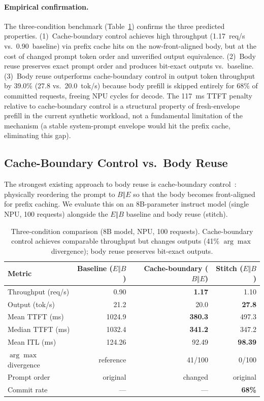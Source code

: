 \documentclass[conference]{IEEEtran}
\begin{document}
\paragraph{Empirical confirmation.}
The three-condition benchmark (Table~\ref{tab:reorder-comparison-results}) confirms the three predicted properties. (1)~Cache-boundary control achieves high throughput (1.17~req/s vs.\ 0.90~baseline) via prefix cache hits on the now-front-aligned body, but at the cost of changed prompt token order and unverified output equivalence. (2)~Body reuse preserves exact prompt order and produces bit-exact outputs vs.\ baseline. (3)~Body reuse outperforms cache-boundary control in output token throughput by 39.0\% (27.8 vs.\ 20.0~tok/s) because body prefill is skipped entirely for 68\% of committed requests, freeing NPU cycles for decode. The 117~ms TTFT penalty relative to cache-boundary control is a structural property of fresh-envelope prefill in the current synthetic workload, not a fundamental limitation of the mechanism (a stable system-prompt envelope would hit the prefix cache, eliminating this gap).

\subsection{Cache-Boundary Control vs.\ Body Reuse}
\label{sec:reorder-comparison}

The strongest existing approach to body reuse is cache-boundary control~\cite{lumer2026dontbreak}: physically reordering the prompt to $B \Vert E$ so that the body becomes front-aligned for prefix caching. We evaluate this on an 8B-parameter instruct model (single NPU, 100 requests) alongside the $E \Vert B$ baseline and body reuse (stitch).

\begin{table}[t]
\caption{Three-condition comparison (8B model, NPU, 100 requests). Cache-boundary control achieves comparable throughput but changes outputs (41\% $\arg\max$ divergence); body reuse preserves bit-exact outputs.}
\label{tab:reorder-comparison-results}
\centering
\footnotesize
\setlength{\tabcolsep}{3pt}
\begin{tabular}{@{}lrrr@{}}
\toprule
Metric & Baseline ($E \Vert B$) & Cache-boundary ($B \Vert E$) & Stitch ($E \Vert B$) \\
\midrule
Throughput (req/s) & 0.90 & \textbf{1.17} & 1.10 \\
Output (tok/s) & 21.2 & 20.0 & \textbf{27.8} \\
Mean TTFT (ms) & 1024.9 & \textbf{380.3} & 497.3 \\
Median TTFT (ms) & 1032.4 & \textbf{341.2} & 347.2 \\
Mean ITL (ms) & 124.26 & 92.49 & \textbf{98.39} \\
$\arg\max$ divergence & reference & \textcolor{envred}{41/100} & \textcolor{envgreen}{0/100} \\
Prompt order & original & \textcolor{envred}{changed} & original \\
Commit rate & {---} & {---} & \textbf{68\%} \\
\bottomrule
\end{tabular}
\end{table}
\end{document}
